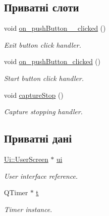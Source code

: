 \subsection*{Приватні слоти}
\begin{DoxyCompactItemize}
\item 
\hypertarget{classUserScreen_a6e25c29ff53726317f4056b66fcb9a18}{void \hyperlink{classUserScreen_a6e25c29ff53726317f4056b66fcb9a18}{on\-\_\-push\-Button\-\_\-\_\-clicked} ()}\label{classUserScreen_a6e25c29ff53726317f4056b66fcb9a18}

\begin{DoxyCompactList}\small\item\em Exit button click handler. \end{DoxyCompactList}\item 
\hypertarget{classUserScreen_a6e79ba614aa7a1af1520cc78d5e7c264}{void \hyperlink{classUserScreen_a6e79ba614aa7a1af1520cc78d5e7c264}{on\-\_\-push\-Button\-\_\-clicked} ()}\label{classUserScreen_a6e79ba614aa7a1af1520cc78d5e7c264}

\begin{DoxyCompactList}\small\item\em Start button click handler. \end{DoxyCompactList}\item 
\hypertarget{classUserScreen_a427fbc50935a1e53f000c987f08ab2e2}{void \hyperlink{classUserScreen_a427fbc50935a1e53f000c987f08ab2e2}{capture\-Stop} ()}\label{classUserScreen_a427fbc50935a1e53f000c987f08ab2e2}

\begin{DoxyCompactList}\small\item\em Capture stopping handler. \end{DoxyCompactList}\end{DoxyCompactItemize}
\subsection*{Приватні дані}
\begin{DoxyCompactItemize}
\item 
\hypertarget{classUserScreen_ade24b1857f428a1a247fd622a51c8de8}{\hyperlink{classUi_1_1UserScreen}{Ui\-::\-User\-Screen} $\ast$ \hyperlink{classUserScreen_ade24b1857f428a1a247fd622a51c8de8}{ui}}\label{classUserScreen_ade24b1857f428a1a247fd622a51c8de8}

\begin{DoxyCompactList}\small\item\em User interface reference. \end{DoxyCompactList}\item 
\hypertarget{classUserScreen_a36d9ae5cffae28edb5dcaededdacea9e}{Q\-Timer $\ast$ \hyperlink{classUserScreen_a36d9ae5cffae28edb5dcaededdacea9e}{t}}\label{classUserScreen_a36d9ae5cffae28edb5dcaededdacea9e}

\begin{DoxyCompactList}\small\item\em Timer instance. \end{DoxyCompactList}\end{DoxyCompactItemize}



